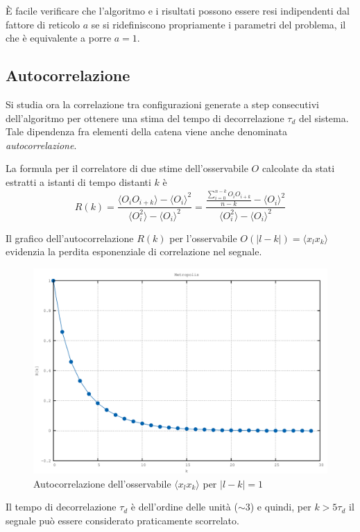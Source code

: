 È facile verificare che l'algoritmo e i risultati possono essere resi indipendenti dal fattore di reticolo $a$ se si ridefiniscono propriamente i parametri del problema, il che è equivalente a porre $a=1$.

\subsection{Autocorrelazione}

Si studia ora la correlazione tra configurazioni generate a step consecutivi dell'algoritmo per ottenere una stima del tempo di decorrelazione $\tau_d$ del sistema. Tale dipendenza fra elementi della catena viene anche denominata \textit{autocorrelazione}.

La formula per il correlatore di due stime dell'osservabile $O$ calcolate da stati estratti a istanti di tempo distanti $k$ è
$$R(k)=\frac{\langle O_iO_{i+k}\rangle-\langle O_i\rangle^2}{\langle O_i^2\rangle-\langle O_i\rangle^2}=\frac{\frac{\sum\limits_{i=0}^{n-k}O_iO_{i+k}}{n-k}-\langle O_i\rangle^2}{\langle O_i^2\rangle-\langle O_i\rangle^2}$$

Il grafico dell'autocorrelazione $R(k)$ per l'osservabile $O(|l-k|)=\langle x_lx_k\rangle$ evidenzia la perdita esponenziale di correlazione nel segnale.
\begin{figure}[H]
\centering
\includegraphics[width=\textwidth]{autocorrelation}
\caption{Autocorrelazione dell'osservabile $\langle x_lx_k\rangle$ per $|l-k|=1$}
\label{fig:autocorrelation}
\end{figure}
Il tempo di decorrelazione $\tau_d$ è dell'ordine delle unità ($\sim3$) e quindi, per $k>5\tau_d$ il segnale può essere considerato praticamente scorrelato.

